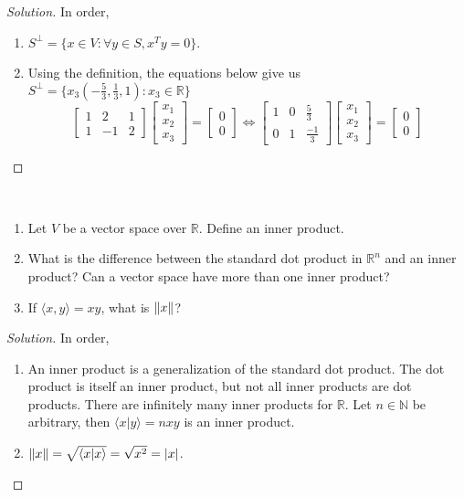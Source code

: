     \begin{proof}[Solution]
    In order,
    \begin{enumerate}
        \item $S^{\perp} = \{x\in V: \forall y\in S, x^T y = 0\}$.
        \item Using the definition, the equations below give us $S^{\perp}=\{x_{3}(-\frac{5}{3},\frac{1}{3},1):x_{3}\in \mathbb{R}\}$
        \begin{equation*}
            \begin{bmatrix}1&2&1\\1&-1&2\end{bmatrix}\begin{bmatrix}x_1\\x_2\\x_3\end{bmatrix}=\begin{bmatrix}0\\0\end{bmatrix}\Leftrightarrow\begin{bmatrix}1&0&\frac{5}{3} \\0&1&\frac{-1}{3}\end{bmatrix}\begin{bmatrix}x_1\\x_2\\x_3\end{bmatrix}=\begin{bmatrix}0\\0\end{bmatrix}
        \end{equation*}
    \end{enumerate}
    \end{proof}
    \begin{problem}
    \
    \begin{enumerate}
        \item Let $V$ be a vector space over $\mathbb{R}$. Define an inner product.
        \item What is the difference between the standard dot product in $\mathbb{R}^n$ and an inner product? Can a vector space have more than one inner product?
        \item If $\langle x,y \rangle = xy$, what is $\lVert x\rVert$?
    \end{enumerate}
    \end{problem}
    \begin{proof}[Solution]
    In order,
    \begin{enumerate}
        \item   An inner product is a generalization of the standard dot
                product. The dot product is itself an inner product, but not
                all inner products are dot products. There are infinitely many
                inner products for $\mathbb{R}$. Let $n\in \mathbb{N}$ be
                arbitrary, then $\langle{x}|y\rangle=nxy$ is an inner product.
        \item   $\lVert x\rVert=\sqrt{\langle{x}|x\rangle}=\sqrt{x^2}= |x|$.
    \end{enumerate}
    \end{proof}
